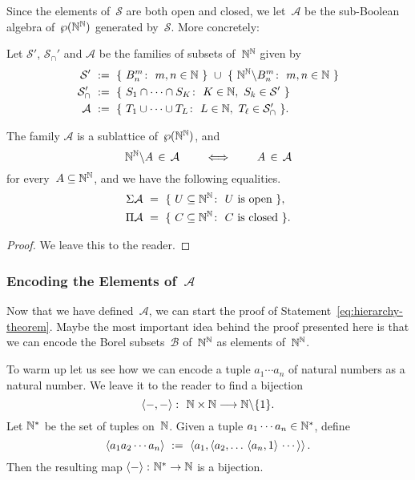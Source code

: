 \documentclass[main.tex]{subfiles}
\begin{document}
Since the elements of~$\mathcal{S}$ are both open and closed,
we let~$\mathcal{A}$ be the sub-Boolean algebra
of~$\wp(\mathbb{N}^{\mathbb{N}})$
generated by~$\mathcal{S}$.
More concretely:
\begin{dfn}\label{D:bhier-A}
Let $\mathcal{S}'$, $\mathcal{S}_\cap'$
and $\mathcal{A}$ be the families of subsets of~$\mathbb{N}^{\mathbb{N}}$ given by
\begin{alignat*}{3}
\mathcal{S}' 
\ &\eqdf\ 
\{\ B^m_n \colon \ m,n\in\N \ \}
\ \cup\ 
\{\ \N^\N\backslash B^m_n \colon \ m,n\in\N \ \}\\
\mathcal{S}_\cap'
\ &\eqdf\ 
\{ \ S_1 \cap \dotsb\cap S_K\colon\ 
K\in\N,\  S_k\in \mathcal{S}'\ \} \\ 
\mathcal{A}
\ &\eqdf\ 
\{ \ T_1 \cup \dotsb\cup T_L\colon\ 
L\in\N,\  T_\ell\in \mathcal{S}_\cap'\ \}.
\end{alignat*}
\end{dfn}
\begin{lem}
The family
$\mathcal{A}$
is a sublattice of~$\wp(\mathbb{N}^{\mathbb{N}})$,
and 
\begin{equation*}
\mathbb{N}^{\mathbb{N}}\backslash A\,\in\,\mathcal{A}
\qquad\iff\qquad
A\,\in\,\mathcal{A}
\end{equation*}
for every~$A\subseteq\mathbb{N}^{\mathbb{N}}$,
and we have the following equalities.
\begin{alignat*}{3}
\Sigma\mathcal{A} \ &=\ 
\{ \ U\subseteq \N^\N\colon\ U\text{ is open}\ \},\\
\Pi\mathcal{A} \ &=\ 
\{ \ C\subseteq \N^\N\colon \ C\text{ is closed}\ \}.
\end{alignat*}
\end{lem}
\begin{proof}
We leave this to the reader.
\end{proof}


\subsubsection{Encoding the Elements of~$\mathcal{A}$}$\,$\\
Now that we have defined~$\mathcal{A}$,
we can start the proof of
 Statement~\eqref{eq:hierarchy-theorem}.
Maybe the most important idea behind the proof presented here
is that 
we can
encode the  Borel subsets~$\mathcal{B}$ of~$\mathbb{N}^{\mathbb{N}}$
as elements of~$\mathbb{N}^{\mathbb{N}}$.

To warm up
let us see how we can encode 
a tuple $a_1 \dotsb a_n$ of natural numbers as a natural number.
We leave it to the reader to 
find a bijection
\begin{equation*}
\left< -,-\right>\colon \ \mathbb{N}\times \mathbb{N} \longrightarrow \mathbb{N} \backslash\{1\}.
\end{equation*}
Let $\mathbb{N}^*$ be the set of tuples on~$\mathbb{N}$.
Given a tuple $a_1\dotsb a_n \in \mathbb{N}^*$, define
\begin{equation*}
\left< a_1a_2  \dotsb a_n \right>\ \eqdf\ 
\left<a_1, \left<a_2,\dotsc \,\left<a_n, 1 \right>\,\dotsb\,\right>\right>.
\end{equation*}
Then the resulting map  $\left<-\right>\colon \mathbb{N}^* \rightarrow \mathbb{N}$
is a bijection.
\end{document}
